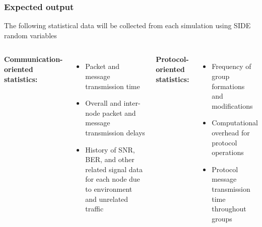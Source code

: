 \documentclass[handout]{beamer}
\begin{document}
\begin{frame}
 \frametitle{Expected output}

\begin{center}
The following statistical data will be collected from each simulation using SIDE random variables
\end{center}

 \begin{columns}[c]
 
    \column{2.0in}
    \textbf{Communication-oriented statistics:}
      \begin{itemize}
        \item Packet and message transmission time
        \item Overall and inter-node packet and message transmission delays
        \item History of SNR, BER, and other related signal data for each node due to environment and unrelated traffic
      \end{itemize}
  
    \column{2.0in}
    \textbf{Protocol-oriented statistics:}
     \begin{itemize}
      \item Frequency of group formations and modifications
      \item Computational overhead for protocol operations 
      \item Protocol message transmission time throughout groups
     \end{itemize}
  \end{columns}

\end{frame}
\end{document}
